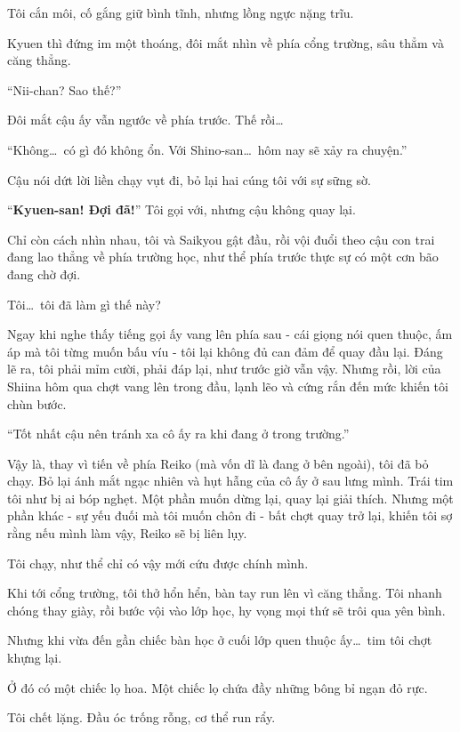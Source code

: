 \documentclass[../main.tex]{subfiles}
\begin{document}
Tôi cắn môi, cố gắng giữ bình tĩnh, nhưng lồng ngực nặng trĩu.

Kyuen thì đứng im một thoáng, đôi mắt nhìn về phía cổng trường, sâu thẳm và căng thẳng.

``Nii-chan? Sao thế?''

Đôi mắt cậu ấy vẫn ngước về phía trước. Thế rồi\dots

``Không\dots\ có gì đó không ổn. Với Shino-san\dots\ hôm nay sẽ xảy ra chuyện.''

Cậu nói dứt lời liền chạy vụt đi, bỏ lại hai cúng tôi với sự sững sờ.

``\textbf{Kyuen-san! Đợi đã!}'' Tôi gọi với, nhưng cậu không quay lại.

Chỉ còn cách nhìn nhau, tôi và Saikyou gật đầu, rồi vội đuổi theo cậu con trai đang lao thẳng về phía trường học, như thể phía trước thực sự có một cơn bão đang chờ đợi.


Tôi\dots\ tôi đã làm gì thế này?

Ngay khi nghe thấy tiếng gọi ấy vang lên phía sau - cái giọng nói quen thuộc, ấm áp mà tôi từng muốn bấu víu - tôi lại không đủ can đảm để quay đầu lại. Đáng lẽ ra, tôi phải mỉm cười, phải đáp lại, như trước giờ vẫn vậy. Nhưng rồi, lời của Shiina hôm qua chợt vang lên trong đầu, lạnh lẽo và cứng rắn đến mức khiến tôi chùn bước.

``Tốt nhất cậu nên tránh xa cô ấy ra khi đang ở trong trường.''

Vậy là, thay vì tiến về phía Reiko (mà vốn dĩ là đang ở bên ngoài), tôi đã bỏ chạy. Bỏ lại ánh mắt ngạc nhiên và hụt hẫng của cô ấy ở sau lưng mình. Trái tim tôi như bị ai bóp nghẹt. Một phần muốn dừng lại, quay lại giải thích. Nhưng một phần khác - sự yếu đuối mà tôi muốn chôn đi - bất chợt quay trở lại, khiến tôi sợ rằng nếu mình làm vậy, Reiko sẽ bị liên lụy.

Tôi chạy, như thể chỉ có vậy mới cứu được chính mình.

\ct

Khi tới cổng trường, tôi thở hổn hển, bàn tay run lên vì căng thẳng. Tôi nhanh chóng thay giày, rồi bước vội vào lớp học, hy vọng mọi thứ sẽ trôi qua yên bình.

Nhưng khi vừa đến gần chiếc bàn học ở cuối lớp quen thuộc ấy\dots\ tim tôi chợt khựng lại.

Ở đó có một chiếc lọ hoa. Một chiếc lọ chứa đầy những bông bỉ ngạn đỏ rực.

Tôi chết lặng. Đầu óc trống rỗng, cơ thể run rẩy.
\end{document}
